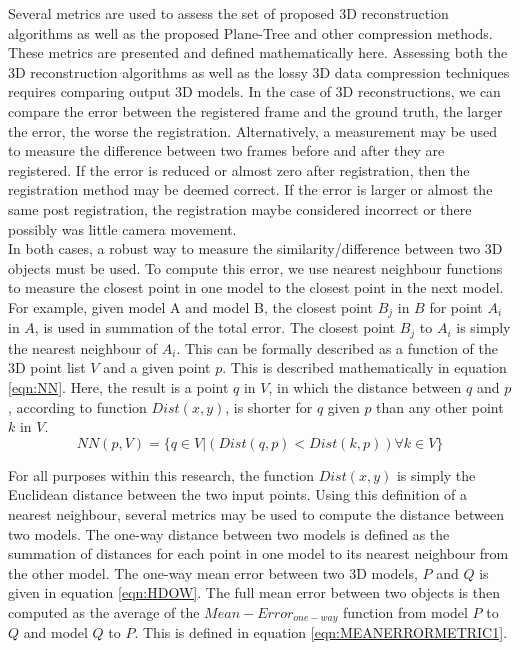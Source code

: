
Several metrics are used to assess the set of proposed 3D reconstruction algorithms as well as the proposed Plane-Tree and other compression methods. These metrics are presented and defined mathematically here. Assessing both the 3D reconstruction algorithms as well as the lossy 3D data compression techniques requires comparing output 3D models. In the case of 3D reconstructions, we can compare the error between the registered frame and the ground truth, the larger the error, the worse the registration. Alternatively, a measurement may be used to measure the difference between two frames before and after they are registered. If the error is reduced or almost zero after registration, then the registration method may be deemed correct. If the error is larger or almost the same post registration, the registration maybe considered incorrect or there possibly was little camera movement. \\


In both cases, a robust way to measure the similarity/difference between two 3D objects must be used. To compute this error, we use nearest neighbour functions to measure the closest point in one model to the closest point in the next model. For example, given model A and model B, the closest point $B_j$ in $B$ for point $A_i$ in $A$, is used in summation of the total error. The closest point $B_j$ to $A_i$ is simply the nearest neighbour of $A_i$. This can be formally described as a function of the 3D point list $V$ and a given point $p$. This is described mathematically in equation \ref{eqn:NN}. Here, the result is a point $q$ in $V$, in which the distance between $q$ and $p$, according to function $Dist(x,y)$, is shorter for $q$ given $p$ than any other point $k$ in $V$.  \\

\begin{equation} \label{eqn:NN}
NN(p, V) =  \{ q \in V | (Dist(q, p) < Dist(k, p))  \forall k \in V \}
\end{equation}

For all purposes within this research, the function $Dist(x,y)$ is simply the Euclidean distance between the two input points. Using this definition of a nearest neighbour, several metrics may be used to compute the distance between two models. The one-way distance between two models is defined as the summation of distances for each point in one model to its nearest neighbour from the other model. The one-way mean error between two 3D models, $P$ and $Q$ is given in equation \ref{eqn:HDOW}. The full mean error between two objects is then computed as the average of the $Mean-Error_{one-way}$ function from model $P$ to $Q$ and model $Q$ to $P$. This is defined in equation \ref{eqn:MEANERRORMETRIC1}. \\


